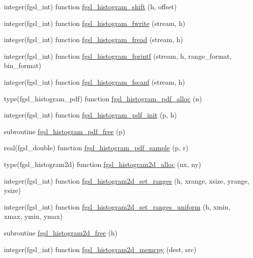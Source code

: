 \begin{DoxyCompactItemize}
\item 
integer(fgsl\-\_\-int) function \hyperlink{histogram_8finc_a9be390cc9127a6ad9c43f1174f6921a3}{fgsl\-\_\-histogram\-\_\-shift} (h, offset)
\item 
integer(fgsl\-\_\-int) function \hyperlink{histogram_8finc_a9cd60d2b4a8975dbc59173525df57213}{fgsl\-\_\-histogram\-\_\-fwrite} (stream, h)
\item 
integer(fgsl\-\_\-int) function \hyperlink{histogram_8finc_ad4d6685a3377f33f0d5696e20d567c11}{fgsl\-\_\-histogram\-\_\-fread} (stream, h)
\item 
integer(fgsl\-\_\-int) function \hyperlink{histogram_8finc_ac04324f86720d5a8fb31ff67add1b52e}{fgsl\-\_\-histogram\-\_\-fprintf} (stream, h, range\-\_\-format, bin\-\_\-format)
\item 
integer(fgsl\-\_\-int) function \hyperlink{histogram_8finc_aaaba1318d1c622c34f72afd75f57255c}{fgsl\-\_\-histogram\-\_\-fscanf} (stream, h)
\item 
type(fgsl\-\_\-histogram\-\_\-pdf) function \hyperlink{histogram_8finc_ac81a0323bfb973e3f0e8bd98c3acf6b8}{fgsl\-\_\-histogram\-\_\-pdf\-\_\-alloc} (n)
\item 
integer(fgsl\-\_\-int) function \hyperlink{histogram_8finc_a49d1a7fc4dec06f53bb7251385c14d0f}{fgsl\-\_\-histogram\-\_\-pdf\-\_\-init} (p, h)
\item 
subroutine \hyperlink{histogram_8finc_afcdb14cb3224ee516b50ecee1d2bc9af}{fgsl\-\_\-histogram\-\_\-pdf\-\_\-free} (p)
\item 
real(fgsl\-\_\-double) function \hyperlink{histogram_8finc_a6bfe5e29af3597cf776cc60d40950dbe}{fgsl\-\_\-histogram\-\_\-pdf\-\_\-sample} (p, r)
\item 
type(fgsl\-\_\-histogram2d) function \hyperlink{histogram_8finc_a58fa9efe4e0dd763ec4dae80d32248b8}{fgsl\-\_\-histogram2d\-\_\-alloc} (nx, ny)
\item 
integer(fgsl\-\_\-int) function \hyperlink{histogram_8finc_a789cf68e724daf4a465a8641e4285fe8}{fgsl\-\_\-histogram2d\-\_\-set\-\_\-ranges} (h, xrange, xsize, yrange, ysize)
\item 
integer(fgsl\-\_\-int) function \hyperlink{histogram_8finc_ae6a0e35aa839f06904e57a2dab500f4d}{fgsl\-\_\-histogram2d\-\_\-set\-\_\-ranges\-\_\-uniform} (h, xmin, xmax, ymin, ymax)
\item 
subroutine \hyperlink{histogram_8finc_a5ccc6ca92d7e8f566652b057ef620681}{fgsl\-\_\-histogram2d\-\_\-free} (h)
\item 
integer(fgsl\-\_\-int) function \hyperlink{histogram_8finc_ac856a8c737e7efa4fe4aed4e7741bf68}{fgsl\-\_\-histogram2d\-\_\-memcpy} (dest, src)

\end{DoxyCompactItemize}
